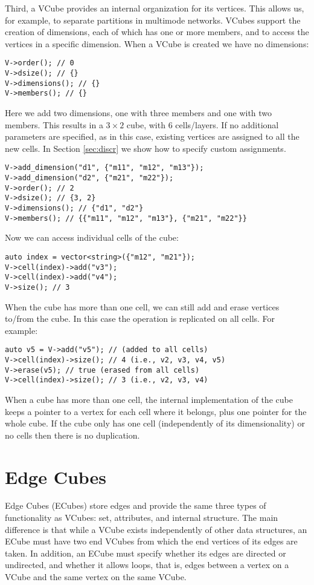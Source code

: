 Third, a VCube provides an internal organization for its vertices. This allows us, for example, to separate partitions in multimode networks. VCubes support the creation of dimensions, each of which has one or more members, and to access the vertices in a specific dimension. When a VCube is created we have no dimensions:
\begin{lstlisting}[style=c++]
V->order(); // 0
V->dsize(); // {}
V->dimensions(); // {}
V->members(); // {}
\end{lstlisting}
Here we add two dimensions, one with three members and one with two members. This results in a $3 \times 2$ cube, with 6 cells/layers. If no additional parameters are specified, as in this case, existing vertices are assigned to all the new cells. In Section \ref{sec:discr} we show how to  specify custom assignments.
\begin{lstlisting}[style=c++]
V->add_dimension("d1", {"m11", "m12", "m13"});
V->add_dimension("d2", {"m21", "m22"});
V->order(); // 2
V->dsize(); // {3, 2}
V->dimensions(); // {"d1", "d2"}
V->members(); // {{"m11", "m12", "m13"}, {"m21", "m22"}}
\end{lstlisting}
Now we can access individual cells of the cube:
 \begin{lstlisting}[style=c++]
auto index = vector<string>({"m12", "m21"});
V->cell(index)->add("v3");
V->cell(index)->add("v4");
V->size(); // 3
\end{lstlisting}
When the cube has more than one cell, we can still add and erase vertices to/from the cube. In this case the operation is replicated on all cells. For example:
\begin{lstlisting}[style=c++]
auto v5 = V->add("v5"); // (added to all cells)
V->cell(index)->size(); // 4 (i.e., v2, v3, v4, v5)
V->erase(v5); // true (erased from all cells)
V->cell(index)->size(); // 3 (i.e., v2, v3, v4)
\end{lstlisting}
When a cube has more than one cell, the internal implementation of the cube keeps a pointer to a vertex for each cell where it belongs, plus one pointer for the whole cube. If the cube only has one cell (independently of its dimensionality) or no cells then there is no duplication.

\section{Edge Cubes}

Edge Cubes (ECubes) store edges and provide the same three types of functionality as VCubes: set, attributes, and internal structure. The main difference is that while a VCube exists independently of other data structures, an ECube must have two end VCubes from which the end vertices of its edges are taken. In addition, an ECube must specify whether its edges are directed or undirected, and whether it allows loops, that is, edges between a vertex on a VCube and the same vertex on the same VCube.

